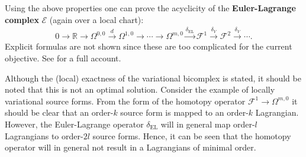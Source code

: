    Using the above properties one can prove the acyclicity of the \textbf{Euler-Lagrange complex} $\mathcal{E}$ (again over a local chart):
    \begin{gather}
        0\longrightarrow\mathbb{R}\longrightarrow\Omega^{0,0}\overset{d}{\longrightarrow}\Omega^{1,0}\longrightarrow\cdots\longrightarrow\Omega^{m,0}\overset{\delta_\mathrm{EL}}{\longrightarrow}\mathcal{F}^1\overset{\delta_V}{\longrightarrow}\mathcal{F}^2\overset{\delta_V}{\longrightarrow}\cdots.
    \end{gather}
    Explicit formulas are not shown since these are too complicated for the current objective. See \cite{var_bicomplex} for a full account.

    \begin{remark}
        Although the (local) exactness of the variational bicomplex is stated, it should be noted that this is not an optimal solution. Consider the example of locally variational source forms. From the form of the homotopy operator $\mathcal{F}^1\rightarrow\Omega^{m,0}$ it should be clear that an order-$k$ source form is mapped to an order-$k$ Lagrangian. However, the Euler-Lagrange operator $\delta_\mathrm{EL}$ will in general map order-$l$ Lagrangians to order-$2l$ source forms. Hence, it can be seen that the homotopy operator will in general not result in a Lagrangians of minimal order.
    \end{remark}

